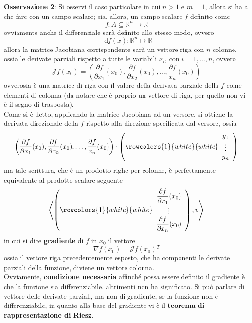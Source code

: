 \documentclass[a4paper]{extarticle}
\newcommand*\dif{\mathop{}\!\mathrm{d}}
\begin{document}
\vspace{2em}
\noindent
\textbf{Osservazione 2}: Si osservi il caso particolare in cui $n>1$ e $m=1$, allora si ha a che fare con un campo scalare; sia, allora, un campo scalare $f$ definito come
\[f : A \subseteq \mathbb{R}^n \rightarrow \mathbb{R}\]
ovviamente anche il differenziale sarà definito allo stesso modo, ovvero
\[\dif f(x) : \mathbb{R}^n \longmapsto \mathbb{R}\]
allora la matrice Jacobiana corrispondente sarà un vettore riga con $n$ colonne, ossia le derivate parziali rispetto a tutte le variabili $x_i$, con $i=1,\dots,n$, ovvero
\[\mathcal{J} f(x_0) = \left(\frac{\partial f}{\partial x_1}(x_0), \frac{\partial f}{\partial x_2}(x_0), \dots, \frac{\partial f}{x_n}(x_0) \right)\]
ovverosia è una matrice di riga con il valore della derivata parziale della $f$ come elementi di colonna (da notare che è proprio un vettore di riga, per quello non vi è il segno di trasposta).\\
Come si è detto, applicando la matrice Jacobiana ad un versore, si ottiene la derivata direzionale della $f$ rispetto alla direzione specificata dal versore, ossia
\[\left(\frac{\partial f}{\partial x_1}(x_0), \frac{\partial f}{\partial x_2}(x_0), \dots, \frac{\partial f}{x_n}(x_0) \right) \cdot \left(
    \rowcolors{1}{white}{white}
    \begin{array}{c}
        y_1\\
        \vdots\\
        y_n
    \end{array}
\right)\]
ma tale scrittura, che è un prodotto righe per colonne, è perfettamente equivalente al prodotto scalare seguente
\[\left<
    \left(
        \rowcolors{1}{white}{white}
        \begin{array}{c}
            \dfrac{\partial f}{\partial x_1}(x_0)\\
            \vdots\\
            \dfrac{\partial f}{\partial x_n}(x_0)
        \end{array}
    \right), v
\right>\]
in cui si dice \textbf{gradiente} di $f$ in $x_0$ il vettore
\[\nabla f(x_0) = \mathcal{J}f(x_0){^T}\]
ossia il vettore riga precedentemente esposto, che ha componenti le derivate parziali della funzione, diviene un vettore colonna.\\
Ovviamente, \textbf{condizione necessaria} affinché possa essere definito il gradiente è che la funzione sia differenziabile, altrimenti non ha significato. Si può parlare di vettore delle derivate parziali, ma non di gradiente, se la funzione non è differenziabile, in quanto alla base del gradiente vi è il \textbf{teorema di rappresentazione di Riesz}.
\end{document}
